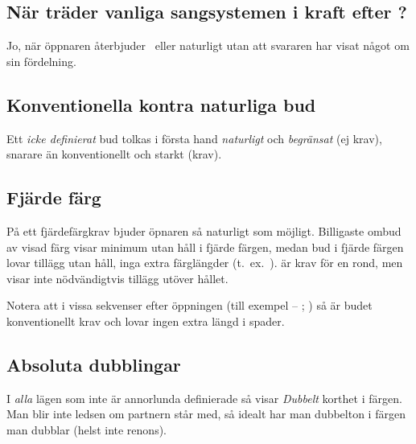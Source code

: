 \subsection{N\"ar tr\"ader vanliga sangsystemen i kraft efter ?}

Jo, n\"ar \"oppnaren \aa{}terbjuder \ eller  naturligt
utan att svararen har visat n\aa{}got om sin f\"ordelning.

\subsection{Konventionella kontra naturliga bud}

 Ett \emph{icke definierat} bud tolkas
      i f\"orsta hand {\em na\-tur\-ligt} och {\em begr\"ansat} (ej krav),
      snarare \"an konventionellt och starkt (krav).

\subsection{Fj\"arde f\"arg}

P{\aa} ett fj\"ardef\"argkrav bjuder \"opnaren s{\aa} naturligt som m\"ojligt.
Billigaste ombud av visad f\"arg visar minimum utan h{\aa}ll i fj\"arde
f\"argen, medan 
bud i fj\"arde f\"argen lovar till\"agg utan h{\aa}ll, inga extra
f\"arg\-l\"ang\-der 
(t.\ ex.\ ).  \"ar krav f\"or en rond, men visar
inte n\"odv\"andigtvis till\"agg ut\"over h{\aa}llet.

Notera att i vissa sekvenser efter öppningen  (till exempel  --
; ) så är budet  konventionellt krav och lovar ingen
extra längd i spader.

\subsection{Absoluta dubblingar}

I \emph{alla} lägen som inte är annorlunda definierade så visar
\emph{Dubbelt} korthet i färgen. Man blir inte ledsen om partnern står
med, så idealt har man dubbelton i färgen man dubblar (helst inte renons). 



